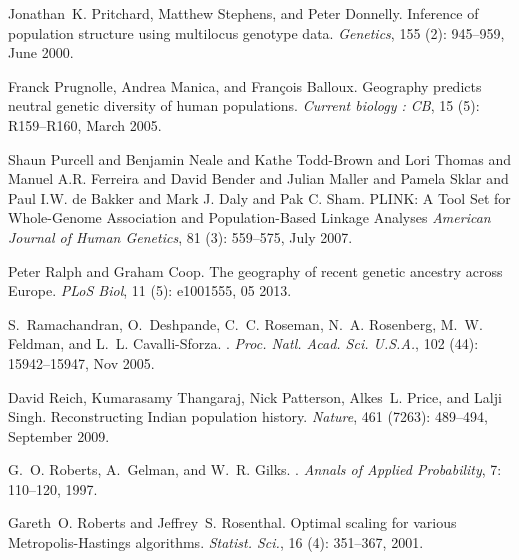 \documentclass[10pt,letterpaper]{article}
\begin{document}
\begin{thebibliography}{80}
Jonathan~K. Pritchard, Matthew Stephens, and Peter Donnelly.
\newblock Inference of population structure using multilocus genotype data.
\newblock \emph{Genetics}, 155 (2): 945--959, June 2000.

Franck Prugnolle, Andrea Manica, and Fran{\c c}ois Balloux.
\newblock Geography predicts neutral genetic diversity of human populations.
\newblock \emph{Current biology : {CB}}, 15 (5): R159--R160,
  March 2005.
  
Shaun Purcell and Benjamin Neale and Kathe Todd-Brown and Lori Thomas and Manuel A.R. Ferreira and David Bender and Julian Maller and Pamela Sklar and Paul I.W. de Bakker and Mark J. Daly and Pak C. Sham.
\newblock PLINK: A Tool Set for Whole-Genome Association and Population-Based Linkage Analyses 
\newblock \emph{American Journal of Human Genetics}, 81 (3):
559--575, July 2007.

Peter Ralph and Graham Coop.
\newblock The geography of recent genetic ancestry across {Europe}.
\newblock \emph{PLoS Biol}, 11 (5): e1001555, 05 2013.

S.~Ramachandran, O.~Deshpande, C.~C. Roseman, N.~A. Rosenberg, M.~W. Feldman,
  and L.~L. Cavalli-Sforza.
.
\newblock \emph{Proc. Natl. Acad. Sci. U.S.A.}, 102 (44):
  15942--15947, Nov 2005.

David Reich, Kumarasamy Thangaraj, Nick Patterson, Alkes~L. Price, and Lalji
  Singh.
\newblock Reconstructing {Indian} population history.
\newblock \emph{Nature}, 461 (7263): 489--494, September
  2009.

G.~O. Roberts, A.~Gelman, and W.~R. Gilks.
.
\newblock \emph{Annals of Applied Probability}, 7: 110--120, 1997.

Gareth~O. Roberts and Jeffrey~S. Rosenthal.
\newblock Optimal scaling for various {M}etropolis-{H}astings algorithms.
\newblock \emph{Statist. Sci.}, 16 (4): 351--367, 2001.


\end{thebibliography}
\end{document}
